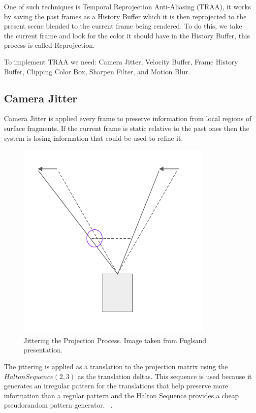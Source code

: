 \documentclass{cslthse-msc}
\begin{document}
One of such techniques is Temporal Reprojection Anti-Aliasing (TRAA), it works by saving the past frames as a History Buffer which it is then reprojected to the present scene blended to the current frame being rendered.  To do this, we take the current frame and look for the color it should have in the History Buffer, this process is called Reprojection.

To implement TRAA we need: Camera Jitter, Velocity Buffer, Frame History Buffer, Clipping Color Box, Sharpen Filter, and Motion Blur.

\subsection{Camera Jitter}
Camera Jitter is applied every frame to preserve information from local regions of surface fragments. If the current frame is static relative to the past ones then the system is losing information that could be used to refine it. ~\cite{Fuglsand2016,XU2016}

\begin{figure}[!hbt]
	\centering
	\includegraphics[scale=0.3]{images/camera_jitter.png}
	\caption{Jittering the Projection Process. Image taken from Fuglsand presentation. \protect\cite{Fuglsand2016}}\label{fig:camerajittering}
\end{figure}

The jittering is applied as a translation to the projection matrix using the $Halton Sequence (2,3)$ as the translation deltas. This sequence is used because it generates an irregular pattern for the translations that help preserve more information than a regular pattern and the Halton Sequence provides a cheap pseudorandom pattern generator. ~\cite{Fuglsand2016,XU2016}. 
\end{document}
